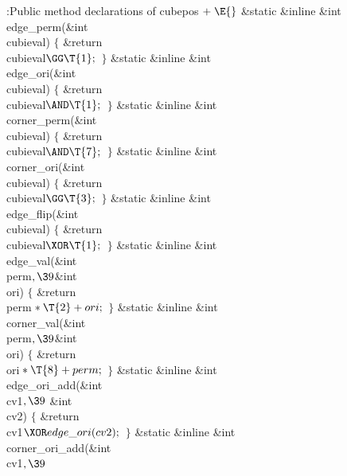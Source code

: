 \Y\B\4:Public method declarations of cubepos\X${}\mathrel+\E{}$\6
\&{static} \&{inline} \&{int} \\{edge\_perm}(\&{int} \\{cubieval})\1\1\2\2\6
${}\{{}$\1\6
\&{return} \\{cubieval}${}\GG\T{1};{}$\6
\4${}\}{}$\2\7
\&{static} \&{inline} \&{int} \\{edge\_ori}(\&{int} \\{cubieval})\1\1\2\2\6
${}\{{}$\1\6
\&{return} \\{cubieval}${}\AND\T{1};{}$\6
\4${}\}{}$\2\7
\&{static} \&{inline} \&{int} \\{corner\_perm}(\&{int} \\{cubieval})\1\1\2\2\6
${}\{{}$\1\6
\&{return} \\{cubieval}${}\AND\T{7};{}$\6
\4${}\}{}$\2\7
\&{static} \&{inline} \&{int} \\{corner\_ori}(\&{int} \\{cubieval})\1\1\2\2\6
${}\{{}$\1\6
\&{return} \\{cubieval}${}\GG\T{3};{}$\6
\4${}\}{}$\2\7
\&{static} \&{inline} \&{int} \\{edge\_flip}(\&{int} \\{cubieval})\1\1\2\2\6
${}\{{}$\1\6
\&{return} \\{cubieval}${}\XOR\T{1};{}$\6
\4${}\}{}$\2\7
\&{static} \&{inline} \&{int} \\{edge\_val}(\&{int} \\{perm}${},\39{}$\&{int} %
\\{ori})\1\1\2\2\6
${}\{{}$\1\6
\&{return} \\{perm}${}*\T{2}+\\{ori};{}$\6
\4${}\}{}$\2\7
\&{static} \&{inline} \&{int} \\{corner\_val}(\&{int} \\{perm}${},\39{}$\&{int}
\\{ori})\1\1\2\2\6
${}\{{}$\1\6
\&{return} \\{ori}${}*\T{8}+\\{perm};{}$\6
\4${}\}{}$\2\7
\&{static} \&{inline} \&{int} \\{edge\_ori\_add}(\&{int} \\{cv1}${},\39{}$%
\&{int} \\{cv2})\1\1\2\2\6
${}\{{}$\1\6
\&{return} \\{cv1}${}\XOR\\{edge\_ori}(\\{cv2});{}$\6
\4${}\}{}$\2\7
\&{static} \&{inline} \&{int} \\{corner\_ori\_add}(\&{int} \\{cv1}${},\39{}$%
